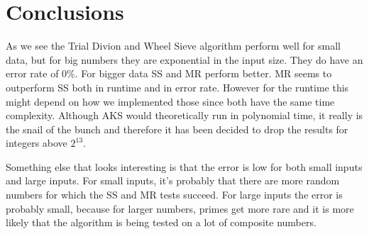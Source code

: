 \section{Conclusions}


As we see the Trial Divion and Wheel Sieve algorithm perform well for small data, but for big numbers they are exponential in the input size.
They do have an error rate of $0\%$.
For bigger data SS and MR perform better.
MR seems to outperform SS both in runtime and in error rate.
However for the runtime this might depend on how we implemented those since both have the same time complexity.
Although AKS would theoretically run in polynomial time, it really is the snail of the bunch and therefore it has been decided to drop the results for integers above $2^13$.

Something else that looks interesting is that the error is low for both small inputs and large inputs.
For small inputs, it's probably that there are more random numbers for which the SS and MR tests succeed.
For large inputs the error is probably small, because for larger numbers, primes get more rare and it is more likely that the algorithm is being tested on a lot of composite numbers.
